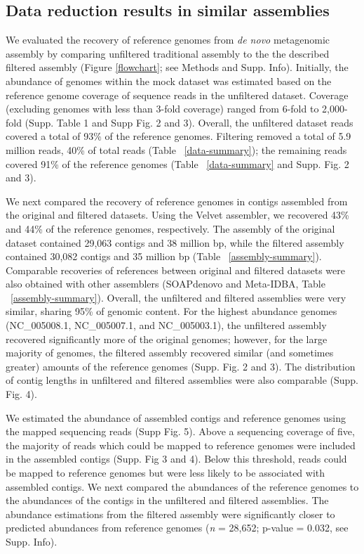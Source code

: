 \documentclass[11pt]{article} %
\begin{document}
\subsection{Data reduction results in similar assemblies}

We evaluated the recovery of reference genomes from {\em de novo}
metagenomic assembly by comparing unfiltered traditional assembly to
the the described filtered assembly (Figure \ref{flowchart}; see Methods and
Supp. Info). Initially, the abundance of genomes within the mock
dataset was estimated based on the reference genome coverage of
sequence reads in the unfiltered dataset.  Coverage (excluding genomes
with less than 3-fold coverage) ranged from 6-fold to 2,000-fold
(Supp. Table 1 and Supp Fig. 2 and 3).  Overall, the
unfiltered dataset reads covered a total of 93\% of the reference
genomes.  Filtering removed a total of 5.9 million reads, 40\% of
total reads (Table ~\ref{data-summary});  the remaining
reads covered 91\% of the reference genomes
(Table ~\ref{data-summary} and Supp. Fig. 2 and 3).

We next compared the recovery of reference genomes in contigs
assembled from the original and filtered datasets.  Using the Velvet
assembler, we recovered 43\% and 44\% of the reference genomes, respectively.  The
assembly of the original dataset contained 29,063 contigs and 38
million bp, while the filtered assembly contained 30,082 contigs and
35 million bp (Table ~\ref{assembly-summary}).  Comparable recoveries
of references between original and filtered datasets were also
obtained with other assemblers (SOAPdenovo and Meta-IDBA, 
Table ~\ref{assembly-summary}).  Overall,
the unfiltered and filtered assemblies were very similar, sharing 95\%
of genomic content.  For the highest abundance genomes
(NC\_005008.1, NC\_005007.1, and
NC\_005003.1), the unfiltered assembly recovered
significantly more of the original genomes; however, for the large
majority of genomes, the filtered assembly recovered similar (and
sometimes greater) amounts of the reference genomes (Supp. Fig. 2 and
3).  The distribution of contig lengths in unfiltered and filtered
assemblies were also comparable (Supp. Fig. 4).

We estimated the abundance of assembled contigs and reference genomes
using the mapped sequencing reads (Supp Fig. 5).  Above a
sequencing coverage of five, the majority of reads which could be
mapped to reference genomes were included in the assembled contigs
(Supp. Fig 3 and 4).  Below this threshold, reads could be mapped to
reference genomes but were less likely to be associated with assembled
contigs.  We next compared the abundances of the reference genomes to
the abundances of the contigs in the unfiltered and filtered
assemblies.  The abundance estimations from the filtered assembly were
significantly closer to predicted abundances from reference genomes
(\emph{n} = 28,652; p-value = 0.032, see Supp. Info).
\end{document}

